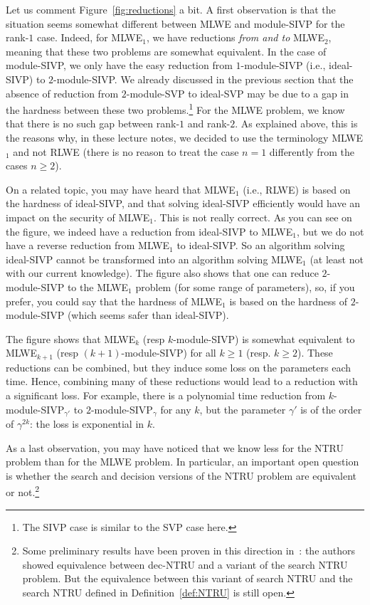 Let us comment Figure~\ref{fig:reductions} a bit. A first observation is that the situation seems somewhat different between MLWE and module-SIVP for the rank-$1$ case. Indeed, for MLWE$_1$, we have reductions \emph{from and to} MLWE$_2$, meaning that these two problems are somewhat equivalent. In the case of module-SIVP, we only have the easy reduction from $1$-module-SIVP (i.e., ideal-SIVP) to $2$-module-SIVP. We already discussed in the previous section that the absence of reduction from $2$-module-SVP to ideal-SVP may be due to a gap in the hardness between these two problems.\footnote{The SIVP case is similar to the SVP case here.} For the MLWE problem, we know that there is no such gap between rank-$1$ and rank-$2$. As explained above, this is the reasons why, in these lecture notes, we decided to use the terminology MLWE$_1$ and not RLWE (there is no reason to treat the case $n = 1$ differently from the cases $n \geq 2$).

On a related topic, you may have heard that MLWE$_1$ (i.e., RLWE) is based on the hardness of ideal-SIVP, and that solving ideal-SIVP efficiently would have an impact on the security of MLWE$_1$. This is not really correct. As you can see on the figure, we indeed have a reduction from ideal-SIVP to MLWE$_1$, but we do not have a reverse reduction from MLWE$_1$ to ideal-SIVP. So an algorithm solving ideal-SIVP cannot be transformed into an algorithm solving MLWE$_1$ (at least not with our current knowledge). The figure also shows that one can reduce $2$-module-SIVP to the MLWE$_1$ problem (for some range of parameters), so, if you prefer, you could say that the hardness of MLWE$_1$ is based on the hardness of $2$-module-SIVP (which seems safer than ideal-SIVP).

The figure shows that MLWE$_k$ (resp $k$-module-SIVP) is somewhat equivalent to MLWE$_{k+1}$ (resp $(k+1)$-module-SIVP) for all $k \geq 1$ (resp. $k \geq 2$). These reductions can be combined, but they induce some loss on the parameters each time. Hence, combining many of these reductions would lead to a reduction with a significant loss. For example, there is a polynomial time reduction from $k$-module-SIVP$_{\gamma'}$ to $2$-module-SIVP$_\gamma$ for any $k$, but the parameter $\gamma'$ is of the order of $\gamma^{2k}$: the loss is exponential in $k$.

As a last observation, you may have noticed that we know less for the NTRU problem than for the MLWE problem. In particular, an important open question is whether the search and decision versions of the NTRU problem are equivalent or not.\footnote{Some preliminary results have been proven in this direction in~\cite{PS21}: the authors showed equivalence between dec-NTRU and a variant of the search NTRU problem. But the equivalence between this variant of search NTRU and the search NTRU defined in Definition~\ref{def:NTRU} is still open.}

